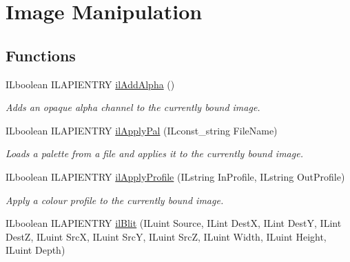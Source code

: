\hypertarget{group__image__manip}{\section{Image Manipulation}
\label{group__image__manip}
}
\subsection*{Functions}
\begin{DoxyCompactItemize}
\item 
I\-Lboolean I\-L\-A\-P\-I\-E\-N\-T\-R\-Y \hyperlink{group__image__manip_ga0e950cae1c2b697137d8e39a56a2602a}{il\-Add\-Alpha} ()
\begin{DoxyCompactList}\small\item\em Adds an opaque alpha channel to the currently bound image. \end{DoxyCompactList}\item 
\hypertarget{group__image__manip_ga014c750459309c1df11cd535b6440786}{I\-Lboolean I\-L\-A\-P\-I\-E\-N\-T\-R\-Y \hyperlink{group__image__manip_ga014c750459309c1df11cd535b6440786}{il\-Apply\-Pal} (I\-Lconst\-\_\-string File\-Name)}\label{group__image__manip_ga014c750459309c1df11cd535b6440786}

\begin{DoxyCompactList}\small\item\em Loads a palette from a file and applies it to the currently bound image. \end{DoxyCompactList}\item 
I\-Lboolean I\-L\-A\-P\-I\-E\-N\-T\-R\-Y \hyperlink{group__image__manip_gad41bda3bd56aa5df16c34b98c8a50224}{il\-Apply\-Profile} (I\-Lstring In\-Profile, I\-Lstring Out\-Profile)
\begin{DoxyCompactList}\small\item\em Apply a colour profile to the currently bound image. \end{DoxyCompactList}\item 
\hypertarget{group__image__manip_ga5733e9e8126ebeea814e1b0f5bb9be44}{I\-Lboolean I\-L\-A\-P\-I\-E\-N\-T\-R\-Y \hyperlink{group__image__manip_ga5733e9e8126ebeea814e1b0f5bb9be44}{il\-Blit} (I\-Luint Source, I\-Lint Dest\-X, I\-Lint Dest\-Y, I\-Lint Dest\-Z, I\-Luint Src\-X, I\-Luint Src\-Y, I\-Luint Src\-Z, I\-Luint Width, I\-Luint Height, I\-Luint Depth)}\label{group__image__manip_ga5733e9e8126ebeea814e1b0f5bb9be44}


\end{DoxyCompactItemize}

